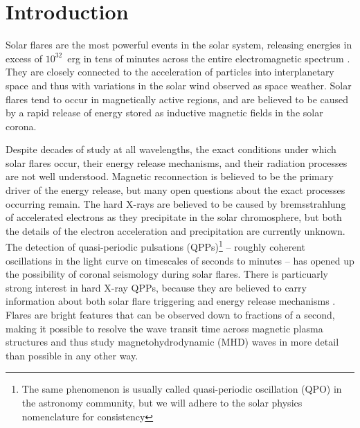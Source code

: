 \documentclass{aastex61}
\begin{document}

\section{Introduction} \label{sec:intro}
Solar flares are the most powerful events in the solar system, releasing energies in excess of $10^{32}$~erg in tens of minutes across the entire electromagnetic spectrum \citep[e.g.\ ][]{fletcher2011}. 
They are closely connected to the acceleration of particles into interplanetary space and thus with variations in the solar wind observed as space weather. 
Solar flares tend to occur in magnetically active regions, and are believed to be caused by a rapid release of energy stored as inductive magnetic fields in the solar corona. 

Despite decades of study at all wavelengths, the exact conditions under which solar flares occur, their energy release mechanisms, and their radiation processes are not well understood.
Magnetic reconnection is believed to be the primary driver of the energy release, but many open questions about the exact processes occurring remain. 
The hard X-rays are believed to be caused by bremsstrahlung of accelerated electrons as they precipitate in the solar chromosphere,  but both the details of the electron acceleration and precipitation are currently unknown.
The detection of quasi-periodic pulsations (QPPs)\footnote{\normalsize{The same phenomenon is usually called quasi-periodic oscillation (QPO) in the astronomy community, but we will adhere to the solar physics nomenclature for consistency}} -- roughly coherent oscillations in the light curve on timescales of seconds to minutes -- has opened up the possibility of coronal seismology during solar flares. 
There is particuarly strong interest in hard X-ray QPPs, because they are believed to carry information about both solar flare triggering and energy release mechanisms \citep[see e.g.][]{nakariakov2009}. 
Flares are bright features that can be observed down to fractions of a second, making it possible to resolve the wave transit time across magnetic plasma structures and thus study magnetohydrodynamic (MHD) waves in more detail than possible in any other way. 
\end{document}
